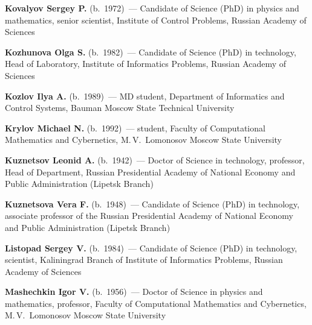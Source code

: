 \begin{multicols}{2}
\vspace*{5.5pt}

\noindent
\textbf{Kovalyov Sergey P.} (b.\ 1972)~--- Candidate of Science (PhD) in physics and 
mathematics, senior scientist, Institute of Control Problems, Russian Academy 
of Sciences

\vspace*{5.5pt}

\noindent
\textbf{Kozhunova Olga S.} (b.\ 1982)~--- Candidate of Science (PhD) in technology, Head of 
Laboratory, Institute of Informatics Problems, Russian Academy of Sciences

\vspace*{5.5pt}

\noindent
\textbf{Kozlov Ilya A.} (b.\ 1989)~--- MD student, Department of 
Informatics and Control Systems, Bauman Moscow State 
Technical University

\vspace*{5.5pt}

\noindent
\textbf{Krylov Michael N.} (b.\ 1992)~--- student, Faculty of Computational Mathematics and 
Cybernetics, M.\,V.~Lomonosov Moscow State University

\vspace*{5.5pt}

\noindent
\textbf{Kuznetsov Leonid A.} (b.\ 1942)~--- Doctor of Science in technology, professor, 
Head of Department, Russian Presidential Academy of National Economy and Public 
Administration  (Lipetsk Branch)

\vspace*{5.5pt}

\noindent
\textbf{Kuznetsova Vera F.} (b.\ 1948)~--- Candidate of Science (PhD) in technology, 
associate professor of the Russian Presidential Academy of National Economy and 
Public Administration  (Lipetsk Branch)


\vspace*{5.5pt}

\noindent
\textbf{Listopad Sergey V.} (b.\ 1984)~--- Candidate of Science (PhD) in technology, 
scientist, Kaliningrad Branch of Institute of Informatics Problems, Russian 
Academy of Sciences

\vspace*{5.5pt}

\noindent
\textbf{Mashechkin Igor V.} (b.\ 1956)~--- Doctor of Science in physics and mathematics, 
professor, Faculty of Computational Mathematics and Cybernetics, M.\,V.~Lomonosov Moscow State University


\end{multicols}
